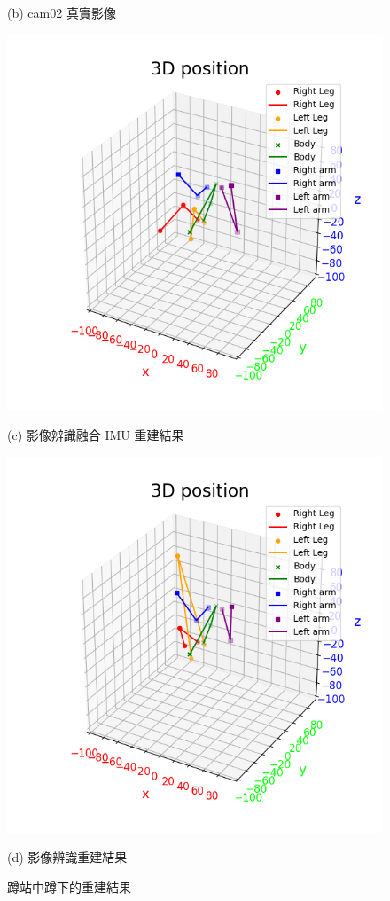 \begin{figure}[!ht]
\begin{minipage}{.5\textwidth}
       \caption*{(b) cam02 真實影像}
    \end{minipage}
    \begin{minipage}{.5\textwidth}
       \centering
       \includegraphics[width=.95\linewidth]{figure/ch4_fig_bar_result_with2.png}
       \caption*{(c) 影像辨識融合 IMU 重建結果}
    \end{minipage}%
    \begin{minipage}{.5\textwidth}
       \centering
       \includegraphics[width=.95\linewidth]{figure/ch4_fig_bar_result_no2.png}
       \caption*{(d) 影像辨識重建結果}
    \end{minipage}
   \caption[蹲站中蹲下的重建結果]{蹲站中蹲下的重建結果}
   \label{ch4_fig_bar_squat}
\end{figure}

